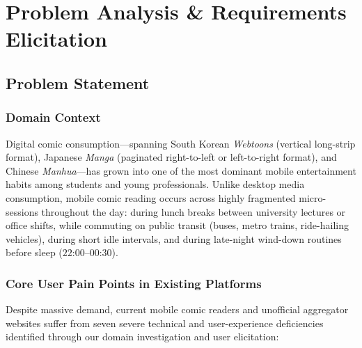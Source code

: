 \section{Problem Analysis \& Requirements Elicitation}
\label{sec:problem_analysis}

\subsection{Problem Statement}
\label{subsec:problem_statement}

\subsubsection{Domain Context}
Digital comic consumption---spanning South Korean \textit{Webtoons} (vertical long-strip format), Japanese \textit{Manga} (paginated right-to-left or left-to-right format), and Chinese \textit{Manhua}---has grown into one of the most dominant mobile entertainment habits among students and young professionals. Unlike desktop media consumption, mobile comic reading occurs across highly fragmented micro-sessions throughout the day: during lunch breaks between university lectures or office shifts, while commuting on public transit (buses, metro trains, ride-hailing vehicles), during short idle intervals, and during late-night wind-down routines before sleep ($22\text{:}00\text{--}00\text{:}30$).

\subsubsection{Core User Pain Points in Existing Platforms}
Despite massive demand, current mobile comic readers and unofficial aggregator websites suffer from seven severe technical and user-experience deficiencies identified through our domain investigation and user elicitation:

